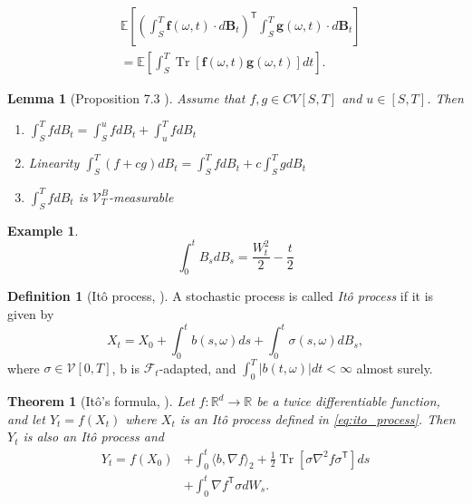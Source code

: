 \documentclass[12pt]{article}
\newtheorem{theorem}{Theorem}[section]
\newtheorem{lemma}[lemma]{Lemma}
\theoremstyle{definition}
\newtheorem{example}[example]{Example}
\newtheorem{definition}[definition]{Definition}
\numberwithin{equation}{section}
\newcommand{\R}{\mathbb{R}}
\newcommand{\CF}{\mathcal{F}}
\newcommand{\CV}{\mathcal{V}}
\newcommand{\T}{\mathsf{T}}
\newcommand{\ev}[1]{\mathbb{E}\left[{#1}\right]}
\newcommand{\scp}[2]{\langle{#1}, {#2}\rangle_2}
\DeclareMathOperator{\Tr}{Tr}
\begin{document}
\begin{equation}
  \label{eq:multivariate_ito_isometry}
  \begin{split}
    &\ev{\left(\int_S^T \pmb{f}(\omega, t)\cdot d\pmb{B}_t\right)^\mathsf{T}\int_S^T \pmb{g}(\omega, t)\cdot d\pmb{B}_t}\\
    &= \ev{\int_S^T \Tr\left[\pmb{f}(\omega, t)\pmb{g}(\omega, t)\right]dt}.
  \end{split}
\end{equation}
\begin{lemma}[Proposition 7.3 ]
  Assume that $f,g \in CV[S,T]$ and $u \in [S,T]$. Then
  \begin{enumerate}[label=(\roman*)]
    \item $\displaystyle\int_S^TfdB_t = \int_S^ufdB_t + \int_u^TfdB_t$
    \item Linearity $\displaystyle\int_S^T(f+cg)dB_t =  \int_S^TfdB_t + c \int_S^TgdB_t$
    \item $\displaystyle\int_S^TfdB_t$ is $\CV_T^B$-measurable
  \end{enumerate}
\end{lemma}
\begin{example}
  \begin{equation}
    \int_0^t B_s dB_s = \frac{W_t^2}{2} - \frac{t}{2}
  \end{equation}
\end{example}
\begin{definition}[Itô process, \cite{eAppliedStochasticAnalysis2021}]
  A stochastic process is called \emph{Itô process} if it is given by
  \begin{equation}
    \label{eq:ito_process}
    X_t = X_0 + \int_0^tb(s, \omega)ds + \int_0^t \sigma(s, \omega)dB_s,
  \end{equation}
  where $\sigma \in \CV[0,T]$, b is $\CF_t$-adapted, and $\int_0^T |b(t, \omega)|dt < \infty$ almost surely.
\end{definition}
\begin{theorem}[Itô's formula, ]
  \label{thm:ito_formula}
  Let $f : \R^d \rightarrow \R$ be a twice differentiable function, and let $Y_t = f(X_t)$ where $X_t$ is an Itô process defined in \eqref{eq:ito_process}. Then $Y_t$ is also an Itô process and
  \begin{equation}
    \begin{split}
    Y_t = f(X_0) &+ \int_0^t \scp{b}{\nabla f}+ \frac{1}{2}\Tr\left[\sigma \nabla^2 f \sigma^\T\right]ds \\
    &+ \int_0^t \nabla f^\T \sigma dW_s.
    \end{split}
  \end{equation}
\end{theorem}
\end{document}
